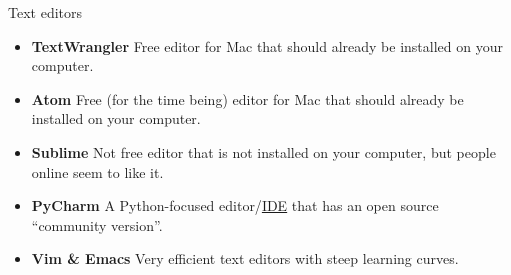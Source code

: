 \begin{frame}{Text editors}
 \begin{itemize}
  \item \textbf{TextWrangler} Free editor for Mac that should already be 
   installed on your computer.
  \item \textbf{Atom} Free (for the time being) editor for Mac that should 
   already be installed on your computer.
  \item \textbf{Sublime} Not free editor that is not installed on your 
   computer, but people online seem to like it.
  \item \textbf{PyCharm} A Python-focused editor/\href{http://en.wikipedia.org/wiki/Integrated_development_environment}{IDE} 
   that has an open source ``community version''.
  \item \textbf{Vim \& Emacs} Very efficient text editors with steep learning 
   curves.
 \end{itemize}
\end{frame}

